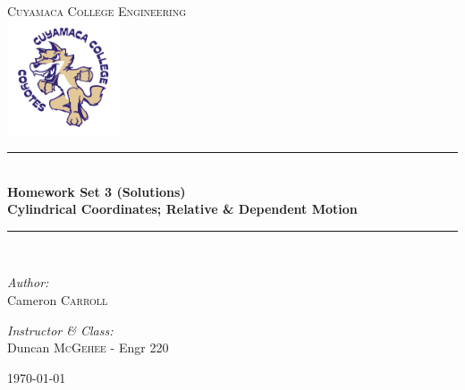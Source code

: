 \documentclass[11pt,letterpaper]{report}
\newcommand{\HRule}{\rule{\linewidth}{0.5mm}}
\begin{document}
\begin{titlepage}
\begin{center}

\textsc{\Large Cuyamaca College Engineering}\\[0.5cm]
\includegraphics[width=0.25\textwidth]{./clogo.jpg}

\HRule \\[0.4cm]
{ \LARGE \bfseries Homework Set 3 (Solutions)}\\[0.5cm]
{ \large \bfseries Cylindrical Coordinates; Relative \& Dependent Motion}\\[0.5cm]

\HRule \\[1.5cm]

\begin{minipage}{0.4\textwidth}
\begin{flushleft} \large
\emph{Author:}\\
Cameron \textsc{Carroll}\\[0.2cm]

\end{flushleft}
\end{minipage}
\begin{minipage}{0.4\textwidth}
\begin{flushright} \large
\emph{Instructor \& Class:}\\
Duncan \textsc{McGehee} - Engr 220
\end{flushright}
\end{minipage}

\vfill

{\large \today}

\end{center}
\end{titlepage}
\end{document}
